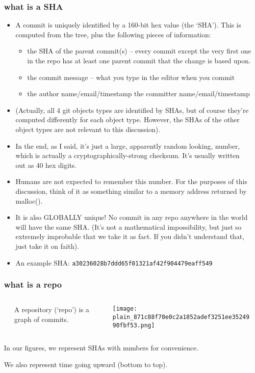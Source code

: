 \documentclass[presentation]{beamer}
\begin{document}
\begin{frame}
\frametitle{what is a SHA}
\label{sec-2-2}


\tiny
\begin{itemize}
\item A commit is uniquely identified by a 160-bit hex value (the `SHA'). This is computed from the tree, plus the following pieces of
  information:
\begin{itemize}
\item \tiny
    the SHA of the parent commit(s) -- every commit except the very
    first one in the repo has at least one parent commit that the change
    is based upon.
\item the commit message -- what you type in the
    editor when you commit
\item the author name/email/timestamp the
    committer name/email/timestamp
\end{itemize}
\item (Actually, all 4 git objects types are identified by SHAs, but of
  course they're computed differently for each object type.  However,
  the SHAs of the other object types are not relevant to this discussion).
\item In the end, as I said, it's just a large, apparently random looking,
  number, which is actually a cryptographically-strong checksum.  It's
  usually written out as 40 hex digits.
\item Humans are not expected to remember this number.  For the purposes
  of this discussion, think of it as something similar to a memory
  address returned by malloc().
\item It is also GLOBALLY unique!  No commit in any repo anywhere in the
  world will have the same SHA.  (It's not a mathematical
  impossibility, but just so extremely improbable that we take it as
  fact.  If you didn't understand that, just take it on faith).
\item An example SHA: \texttt{a30236028b7ddd65f01321af42f904479eaff549}
\end{itemize}
\end{frame}
\begin{frame}
\frametitle{what is a repo}
\label{sec-2-3}
\begin{columns} %
\label{sec-2-3-1}
\begin{column}{0.6\textwidth}
\label{sec-2-3-1-1}


A repository (`repo') is a graph of commits.  
\end{column}
\begin{column}{0.4\textwidth}
\label{sec-2-3-1-2}




\texttt{[image: plain\_871c88f70e0c2a1852adef3251ee3524990fbf53.png]}
\end{column}
\end{columns}
\label{sec-2-3-2}


\small
In our figures, we represent
SHAs with numbers for convenience.  

We also represent time going
upward (bottom to top).
\end{frame}
\end{document}
